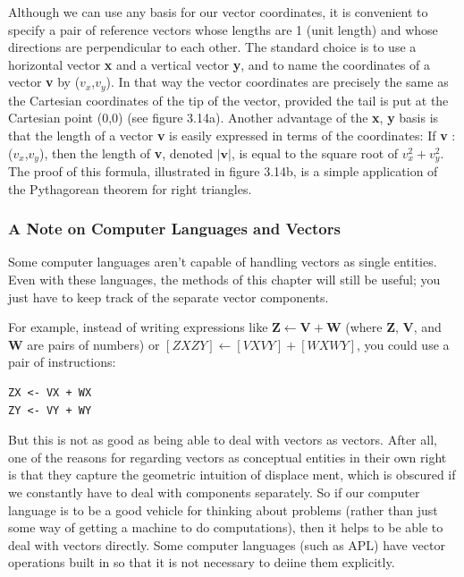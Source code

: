 \documentclass{book}
\begin{document}
Although we can use any basis for our vector coordinates, it is convenient to specify 
a pair of reference vectors whose lengths are 1 (unit length) and whose directions are 
perpendicular to each other. The standard choice is to use a horizontal vector \textbf{x} and a vertical vector \textbf{y}, and
to name the coordinates of a vector \textbf{v} by ($v_x$,$v_y$). In that way the 
vector coordinates are precisely the same as the Cartesian coordinates of
the tip of the vector, provided the tail is put at the Cartesian point
(0,0) (see figure 3.14a). Another advantage of the \textbf{x}, \textbf{y} basis is that the
length of a vector \textbf{v} is easily expressed in terms of the coordinates: If
\textbf{v} : ($v_x$,$v_y$), then the length of \textbf{v}, denoted $|\mathbf{v}|$, is equal to the square
root of $v_x^2 + v_y^2$. The proof of this formula, illustrated in figure 3.14b, is
a simple application of the Pythagorean theorem for right triangles.

\subsubsection{A Note on Computer Languages and Vectors}

Some computer languages aren't capable of handling vectors as single
entities. Even with these languages, the methods of this chapter will still
be useful; you just have to keep track of the separate vector components.

For example, instead of writing expressions like $\mathbf{Z} \leftarrow \mathbf{V} + \mathbf{W}$ (where \textbf{Z},
\textbf{V}, and \textbf{W} are pairs of numbers) or $[ZX ZY] \leftarrow [VX VY] + [WX WY]$, you
could use a pair of instructions:

\begin{verbatim}
ZX <- VX + WX
ZY <- VY + WY
\end{verbatim}
But this is not as good as being able to deal with vectors as vectors. After
all, one of the reasons for regarding vectors as conceptual entities in
their own right is that they capture the geometric intuition of displace
ment, which is obscured if we constantly have to deal with components
separately. So if our computer language is to be a good vehicle for thinking about problems (rather than just some way of getting a machine to
do computations), then it helps to be able to deal with vectors directly.
Some computer languages (such as APL) have vector operations built in
so that it is not necessary to deiine them explicitly.
\end{document}

